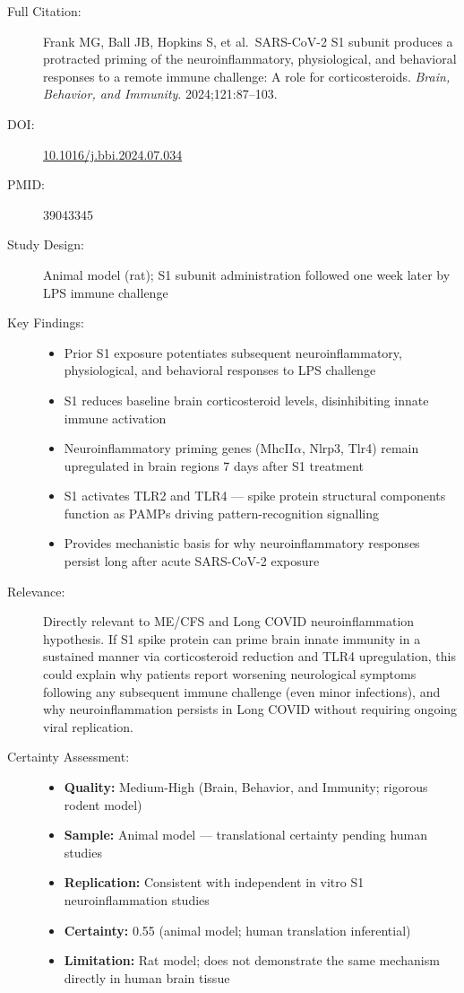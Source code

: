 \begin{description}
    \item[Full Citation:] Frank MG, Ball JB, Hopkins S, et al.\ SARS-CoV-2 S1 subunit produces a protracted priming of the neuroinflammatory, physiological, and behavioral responses to a remote immune challenge: A role for corticosteroids. \textit{Brain, Behavior, and Immunity}. 2024;121:87--103. \cite{Frank2024S1Priming}
    \item[DOI:] \href{https://doi.org/10.1016/j.bbi.2024.07.034}{10.1016/j.bbi.2024.07.034}
    \item[PMID:] 39043345
    \item[Study Design:] Animal model (rat); S1 subunit administration followed one week later by LPS immune challenge
    \item[Key Findings:]
    \begin{itemize}
        \item Prior S1 exposure potentiates subsequent neuroinflammatory, physiological, and behavioral responses to LPS challenge
        \item S1 reduces baseline brain corticosteroid levels, disinhibiting innate immune activation
        \item Neuroinflammatory priming genes (MhcII$\alpha$, Nlrp3, Tlr4) remain upregulated in brain regions 7 days after S1 treatment
        \item S1 activates TLR2 and TLR4 --- spike protein structural components function as PAMPs driving pattern-recognition signalling
        \item Provides mechanistic basis for why neuroinflammatory responses persist long after acute SARS-CoV-2 exposure
    \end{itemize}
    \item[Relevance:] Directly relevant to ME/CFS and Long COVID neuroinflammation hypothesis. If S1 spike protein can prime brain innate immunity in a sustained manner via corticosteroid reduction and TLR4 upregulation, this could explain why patients report worsening neurological symptoms following any subsequent immune challenge (even minor infections), and why neuroinflammation persists in Long COVID without requiring ongoing viral replication.
    \item[Certainty Assessment:]
    \begin{itemize}
        \item \textbf{Quality:} Medium-High (Brain, Behavior, and Immunity; rigorous rodent model)
        \item \textbf{Sample:} Animal model --- translational certainty pending human studies
        \item \textbf{Replication:} Consistent with independent in vitro S1 neuroinflammation studies
        \item \textbf{Certainty:} 0.55 (animal model; human translation inferential)
        \item \textbf{Limitation:} Rat model; does not demonstrate the same mechanism directly in human brain tissue
    \end{itemize}
\end{description}

